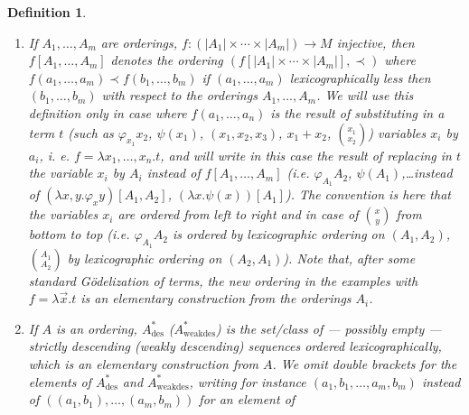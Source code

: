 \documentclass[10pt]{article}
\def \ssubitem#1{\item \label{\actlabel#1} }
\newtheorem {definition} [lemma]{Definition}
\def\all{\forall}
\def\ar{\rightarrow}
\def \Iff{\Leftrightarrow}
\def \cross{\times}
\def\potsetfin{{\mathcal{P}^\mathrm{fin}}}
\def\des{\mathrm{des}}
\def\weakdes{\mathrm{weakdes}}
\def \xvec{{\vec x}}
\def\underlinedef#1{{\it #1}}
\begin{document}
\begin{definition}
{\begin{enumerate}
\underlinedef{$a \prec B$}$:\Iff \exists x \in B.a \prec x$.
This definitions extends to arbitrary classes $B$ as well.\\
If $\prec$ is a binary relation on $A$, 
\underlinedef{$a \preceq b$}$:\Iff
a \prec b \lor a = b$, similarly we define
$\prec '$ from $\prec$, $\leq$ from $<$ etc.\\
If $k: A \ar \potsetfin(B)$ and $C \subseteq B$, then
\underlinedef{$k^{-1}(C)$}$:= \{ x \in A \mid k(x) \subseteq C \} $.\\
We write \underlinedef{$f: A \ar_\omega B$} for $f: A \ar \potsetfin(B)$.
If $f: A \ar_\omega B$, $f': A \ar_\omega B$, $g:B \ar_\omega C$, 
then \underlinedef{$g \circ f$}$:A \ar_\omega C$, $(g \circ f)(a):= g[f(a)]$,
and $f \subseteq f' :\Iff \all x \in A.f(x) \subseteq f'(x)$.
\ssubitem c
If $A_1 ,\ldots, A_m$ are orderings,
$f: (|A_1| \cross  \cdots \cross |A_m|) \ar M$ injective,
then $f[A_1 ,\ldots, A_m]$ denotes the ordering
$(f[|A_1| \cross \cdots \cross  |A_m|],\prec)$ where
$f(a_1 ,\ldots, a_m) \prec f(b_1 ,\ldots, b_m)$ if
$(a_1 ,\ldots, a_m)$  lexicographically less then
$(b_1 ,\ldots, b_m)$ with respect to the orderings
$A_1 ,\ldots, A_m$. 
We will use this definition only in case where 
$f(a_1 ,\ldots, a_n)$ is the result of substituting
in a term $t$ 
(such as $\varphi_{x_1}{x_2}$, $\psi(x_1)$, $(x_1,x_2,x_3)$, 
$x_1+x_2$, %
$\binom{x_1}{x_2}$)
variables $x_i$ by $a_i$, i. e. $f = \lambda x_1 ,\ldots, x_n.t$,
and will write in this case the result of replacing in $t$
the variable $x_i$ by $A_i$ instead of $f[A_1 ,\ldots, A_m]$
(i.e. $\varphi_{A_1}A_2$, $\psi(A_1)$,\ldots instead of
$(\lambda x,y.\varphi_xy)[A_1,A_2]$, $(\lambda x.\psi(x))[A_1]$).
The convention is here that the variables $x_i$ are ordered from
left to right and in case of $\binom{x}{y}$ from bottom to top
(i.e. $\varphi_{A_1}A_2$ is ordered by lexicographic ordering
on $(A_1,A_2)$, $\binom{A_1}{A_2}$ by lexicographic ordering
on $(A_2,A_1)$).
Note that, after some standard G{\"o}delization
of terms,
the new ordering in the examples with $f= \lambda \xvec.t$
is an elementary construction from the
orderings $A_i$.
\ssubitem d
If $A$ is an ordering, $A^\ast_\des$ ($A^\ast_\weakdes$) is the set/class of
--- possibly empty --- strictly descending (weakly descending) sequences 
ordered lexicographically, which is an elementary construction from $A$.
We omit double brackets for the elements of $A^\ast_\des$ and
$A^\ast_\weakdes$, writing for instance 
$(a_1, b_1 ,\ldots, a_m,b_m)$ instead of
$((a_1,b_1) ,\ldots, (a_m,b_m))$ for an element of

\end{enumerate}}
\end{definition}
\end{document}
